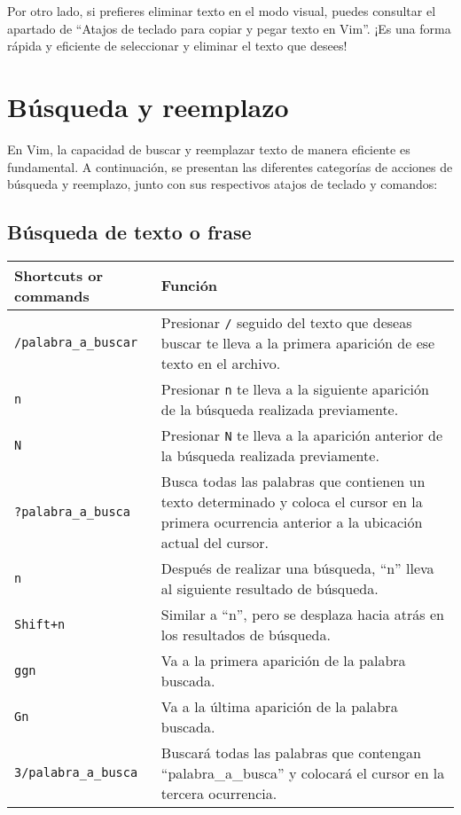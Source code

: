 \documentclass[
  doc,
  floatsintext,
  longtable,
  a4paper,
  nolmodern,
  notxfonts,
  notimes,
  colorlinks=true,linkcolor=blue,citecolor=blue,urlcolor=blue]{apa7}
\begin{document}
Por otro lado, si prefieres eliminar texto en el modo visual, puedes
consultar el apartado de ``Atajos de teclado para copiar y pegar texto
en Vim''. ¡Es una forma rápida y eficiente de seleccionar y eliminar el
texto que desees!

\section{Búsqueda y reemplazo}\label{buxfasqueda-y-reemplazo}

En Vim, la capacidad de buscar y reemplazar texto de manera eficiente es
fundamental. A continuación, se presentan las diferentes categorías de
acciones de búsqueda y reemplazo, junto con sus respectivos atajos de
teclado y comandos:

\subsection{Búsqueda de texto o
frase}\label{buxfasqueda-de-texto-o-frase}

\begin{longtable}[]{@{}
  >{\raggedright\arraybackslash}p{}
  >{\raggedright\arraybackslash}p{}@{}}
\toprule\noalign{}
\begin{minipage}[b]{\linewidth}\raggedright
Shortcuts or commands
\end{minipage} & \begin{minipage}[b]{\linewidth}\raggedright
Función
\end{minipage} \\
\midrule\noalign{}
\endhead
\bottomrule\noalign{}
\endlastfoot
\texttt{/palabra\_a\_buscar} & Presionar \texttt{/} seguido del texto
que deseas buscar te lleva a la primera aparición de ese texto en el
archivo. \\
\texttt{n} & Presionar \texttt{n} te lleva a la siguiente aparición de
la búsqueda realizada previamente. \\
\texttt{N} & Presionar \texttt{N} te lleva a la aparición anterior de la
búsqueda realizada previamente. \\
\texttt{?palabra\_a\_busca} & Busca todas las palabras que contienen un
texto determinado y coloca el cursor en la primera ocurrencia anterior a
la ubicación actual del cursor. \\
\texttt{n} & Después de realizar una búsqueda, ``n'' lleva al siguiente
resultado de búsqueda. \\
\texttt{Shift+n} & Similar a ``n'', pero se desplaza hacia atrás en los
resultados de búsqueda. \\
\texttt{ggn} & Va a la primera aparición de la palabra buscada. \\
\texttt{Gn} & Va a la última aparición de la palabra buscada. \\
\texttt{3/palabra\_a\_busca} & Buscará todas las palabras que contengan
``palabra\_a\_busca'' y colocará el cursor en la tercera ocurrencia. \\
\end{longtable}
\end{document}

